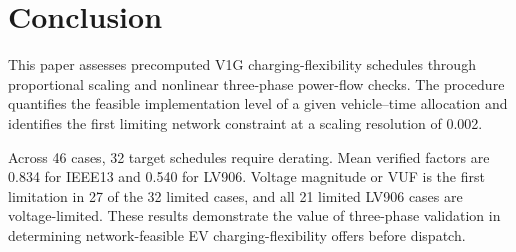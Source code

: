 \documentclass[conference,letterpaper]{IEEEtran}
\begin{document}
\section{Conclusion}
This paper assesses precomputed V1G charging-flexibility schedules through proportional scaling and nonlinear three-phase power-flow checks. The procedure quantifies the feasible implementation level of a given vehicle--time allocation and identifies the first limiting network constraint at a scaling resolution of 0.002.

Across 46 cases, 32 target schedules require derating. Mean verified factors are 0.834 for IEEE13 and 0.540 for LV906. Voltage magnitude or VUF is the first limitation in 27 of the 32 limited cases, and all 21 limited LV906 cases are voltage-limited. These results demonstrate the value of three-phase validation in determining network-feasible EV charging-flexibility offers before dispatch.


\end{document}
